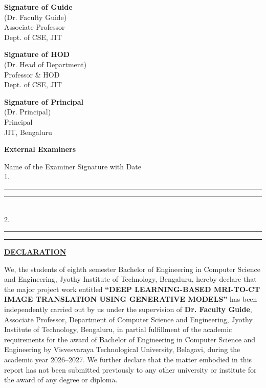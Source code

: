 \documentclass[12pt,a4paper]{report}
\begin{document}
\vspace{35pt}
\noindent
\begin{minipage}[t]{0.32\textwidth}
\raggedright
\textbf{Signature of Guide}\\
\small (Dr. Faculty Guide)\\
Associate Professor\\
Dept. of CSE, JIT
\end{minipage}
\hfill
\begin{minipage}[t]{0.32\textwidth}
\centering
\textbf{Signature of HOD}\\
\small (Dr. Head of Department)\\
Professor \& HOD\\
Dept. of CSE, JIT
\end{minipage}
\hfill
\begin{minipage}[t]{0.32\textwidth}
\raggedleft
\textbf{Signature of Principal}\\
\small (Dr. Principal)\\
Principal\\
JIT, Bengaluru
\end{minipage}

\vspace{45pt}
\begin{center}
\textbf{External Examiners}
\end{center}
\vspace{10pt}
\noindent
Name of the Examiner \hfill Signature with Date\\[14pt]
1. \rule{6cm}{0.4pt} \hfill \rule{4cm}{0.4pt}\\[14pt]
2. \rule{6cm}{0.4pt} \hfill \rule{4cm}{0.4pt}

\newpage
\begin{center}
{\fontsize{16}{20}\selectfont\bfseries\underline{DECLARATION}}
\end{center}
\vspace{15pt}
We, the students of eighth semester Bachelor of Engineering in Computer Science and Engineering, Jyothy Institute of Technology, Bengaluru, hereby declare that the major project work entitled \textbf{``DEEP LEARNING-BASED MRI-TO-CT IMAGE TRANSLATION USING GENERATIVE MODELS''} has been independently carried out by us under the supervision of \textbf{Dr. Faculty Guide}, Associate Professor, Department of Computer Science and Engineering, Jyothy Institute of Technology, Bengaluru, in partial fulfillment of the academic requirements for the award of Bachelor of Engineering in Computer Science and Engineering by Visvesvaraya Technological University, Belagavi, during the academic year 2026--2027. We further declare that the matter embodied in this report has not been submitted previously to any other university or institute for the award of any degree or diploma.
\end{document}
